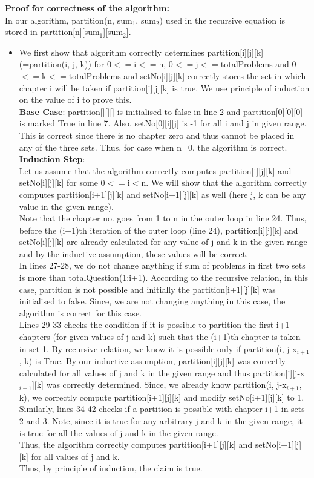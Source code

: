 \documentclass{article}
\begin{document}
\textbf{Proof for correctness of the algorithm:}\\
In our algorithm, partition(n, sum$_{1}$, sum$_{2}$) used in the recursive equation is stored in partition[n][sum$_{1}$][sum$_{2}$].\\
\begin{itemize}
\item We first show that algorithm correctly determines partition[i][j][k] (=partition(i, j, k)) for 0$<=$i$<=$n, 0$<=$j$<=$totalProblems and 0$<=$k$<=$totalProblems and setNo[i][j][k] correctly stores the set in which chapter i will be taken if partition[i][j][k] is true. We use principle of induction on the value of i to prove this.
\\\textbf{Base Case}: partition[][][] is initialised to false in line 2 and partition[0][0][0] is marked True in line 7. Also, setNo[0][i][j] is -1 for all i and j in given range. This is correct since there is no chapter zero and thus cannot be placed in any of the three sets. Thus, for case when n=0, the algorithm is correct.
\\\textbf{Induction Step}:
\\Let us assume that the algorithm correctly computes partition[i][j][k] and setNo[i][j][k] for some 0$<=$i$<$n. We will show that the algorithm correctly computes partition[i+1][j][k] and setNo[i+1][j][k] as well (here j, k can be any value in the given range). 
\\Note that the chapter no. goes from 1 to n in the outer loop in line 24. Thus, before the (i+1)th iteration of the outer loop (line 24), partition[i][j][k] and setNo[i][j][k] are already calculated for any value of j and k in the given range and by the inductive assumption, these values will be correct.
\\In lines 27-28, we do not change anything if sum of problems in first two sets is more than totalQuestion(1:i+1). According to the recursive relation, in this case, partition is not possible and initially the partition[i+1][j][k] was initialised to false. Since, we are not changing anything in this case, the algorithm is correct for this case. 
\\Lines 29-33 checks the condition if it is possible to partition the first i+1 chapters (for given values of j and k) such that the (i+1)th chapter is taken in set 1. By recursive relation, we know it is possible only if partition(i, j-x$_{i+1}$, k) is True. By our inductive assumption, partition[i][j][k] was correctly calculated for all values of j and k in the given range and thus partition[i][j-x$_{i+1}$][k] was correctly determined. Since, we already know partition(i, j-x$_{i+1}$, k), we correctly compute partition[i+1][j][k] and modify setNo[i+1][j][k] to 1. Similarly, lines 34-42 checks if a partition is possible with chapter i+1 in sets 2 and 3. Note, since it is true for any arbitrary j and k in the given range, it is true for all the values of j and k in the given range.\\
Thus, the algorithm correctly computes partition[i+1][j][k] and setNo[i+1][j][k] for all values of j and k.\\
Thus, by principle of induction, the claim is true.
\end{itemize}
\end{document}
